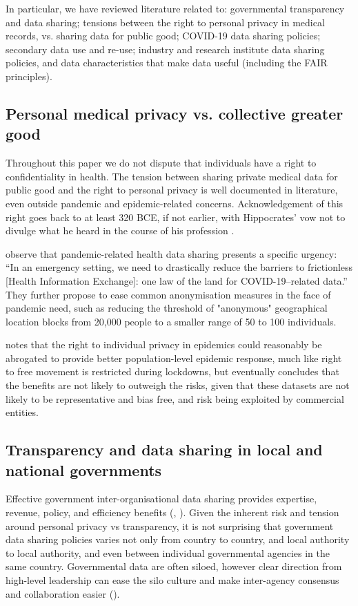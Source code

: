 \documentclass{CUP-JNL-DAP}%
\begin{document}
In particular, we have reviewed literature related to: governmental transparency and data sharing; tensions between the right to personal privacy in medical records, vs. sharing data for public good; COVID-19 data sharing policies; secondary data use and re-use; industry and research institute data sharing policies, and data characteristics that make data useful (including the FAIR principles). 

\subsection{Personal medical privacy vs. collective greater good} 
Throughout this paper we do not dispute that individuals have a right to confidentiality in health. The tension between sharing private medical data for public good and the right to personal privacy is well documented in literature, even outside pandemic and epidemic-related concerns.  Acknowledgement of this right goes back to at least 320 BCE, if not earlier, with Hippocrates' vow not to divulge what he heard in the course of his profession \cite{jones_hippocrates}.  

\cite{Leslie_McSwain} observe that pandemic-related health data sharing presents a specific urgency: \enquote{In an emergency setting, we need to drastically reduce the barriers to frictionless [Health Information Exchange]: one law of the land for COVID-19–related data.} They further propose to ease common anonymisation measures in the face of pandemic need, such as reducing the threshold of "anonymous" geographical location blocks from 20,000 people to a smaller range of 50 to 100 individuals. 

\cite{henderson_patient_2021} notes that the right to individual privacy in epidemics could reasonably be abrogated to provide better population-level epidemic response, much like right to free movement is restricted during lockdowns, but eventually concludes that the benefits are not likely to outweigh the risks, given that these datasets are not likely to be representative and bias free, and risk being exploited by commercial entities.

\subsection{Transparency and data sharing in local and national governments}

Effective government inter-organisational data sharing provides expertise, revenue, policy, and efficiency benefits (\cite{gil-garcia_government_2016}, \cite{ramon_gil-garcia_collaborative_2007}). Given the inherent risk and tension around personal privacy vs transparency, it is not surprising that government data sharing policies varies not only from country to country, and local authority to local authority, and even between individual governmental agencies in the same country. Governmental data are often siloed, however clear direction from high-level leadership can ease the silo culture and make inter-agency consensus and collaboration easier (\cite{graham_navigating_2016}). 
\end{document}
